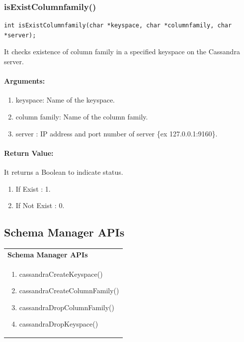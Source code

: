 \subsubsection{isExistColumnfamily()}
\begin{verbatim}
int isExistColumnfamily(char *keyspace, char *columnfamily, char *server);
\end{verbatim}

   It checks existence of column family in a specified keyspace on the Cassandra server.

  \paragraph{Arguments:} 
	        \begin{enumerate}
		    \item keyspace: Name of the keyspace.
		    \item column family: Name of the column family.
		    \item server : IP address and port number of server \{ex 127.0.0.1:9160\}.
		\end{enumerate}
		
 \paragraph{Return Value:}
 It returns a Boolean to indicate status.
\begin{enumerate}
 \item If Exist : 1.
 \item If Not Exist   : 0.
\end{enumerate}



\subsection{Schema Manager APIs} 

\begin{tabular}{ p{7cm} }
 {\bf Schema Manager APIs}\\
  
\begin{enumerate}
   \item cassandraCreateKeyspace()
   \item cassandraCreateColumnFamily()
   \item cassandraDropColumnFamily()
   \item cassandraDropKeyspace()
   \end{enumerate} \\

\end{tabular}
